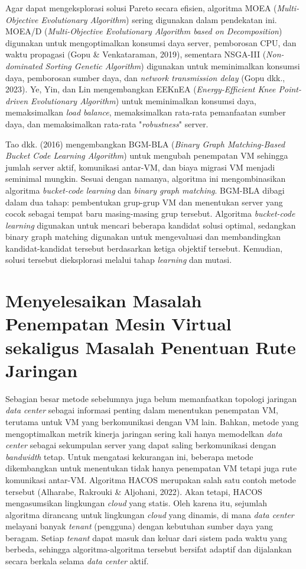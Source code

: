 Agar dapat mengeksplorasi solusi Pareto secara efisien, algoritma MOEA (\textit{Multi-Objective Evolutionary Algorithm}) sering digunakan dalam pendekatan ini. MOEA/D (\textit{Multi-Objective Evolutionary Algorithm based on Decomposition}) digunakan untuk mengoptimalkan konsumsi daya server, pemborosan CPU, dan waktu propagasi (Gopu \& Venkataraman, 2019), sementara NSGA-III (\textit{Non-dominated Sorting Genetic Algorithm}) digunakan untuk meminimalkan konsumsi daya, pemborosan sumber daya, dan \textit{network transmission delay} (Gopu dkk., 2023). Ye, Yin, dan Lin mengembangkan EEKnEA (\textit{Energy-Efficient Knee Point-driven Evolutionary Algorithm}) untuk meminimalkan konsumsi daya, memaksimalkan \textit{load balance}, memaksimalkan rata-rata pemanfaatan sumber daya, dan memaksimalkan rata-rata "\textit{robustness}" server. 

Tao dkk. (2016) mengembangkan BGM-BLA (\textit{Binary Graph Matching-Based Bucket Code Learning Algorithm}) untuk mengubah penempatan VM sehingga jumlah server aktif, komunikasi antar-VM, dan biaya migrasi VM menjadi seminimal mungkin. Sesuai dengan namanya, algoritma ini mengombinasikan algoritma \textit{bucket-code learning} dan \textit{binary graph matching}. BGM-BLA dibagi dalam dua tahap: pembentukan grup-grup VM dan menentukan server yang cocok sebagai tempat baru masing-masing grup tersebut. Algoritma \textit{bucket-code learning} digunakan untuk mencari beberapa kandidat solusi optimal, sedangkan binary graph matching digunakan untuk mengevaluasi dan membandingkan kandidat-kandidat tersebut berdasarkan ketiga objektif tersebut. Kemudian, solusi tersebut dieksplorasi melalui tahap \textit{learning} dan mutasi.


\section{Menyelesaikan Masalah Penempatan Mesin Virtual sekaligus Masalah Penentuan Rute Jaringan}
Sebagian besar metode sebelumnya juga belum memanfaatkan topologi jaringan \textit{data center} sebagai informasi penting dalam menentukan penempatan VM, terutama untuk VM yang berkomunikasi dengan VM lain. Bahkan, metode yang mengoptimalkan metrik kinerja jaringan sering kali hanya memodelkan \textit{data center} sebagai sekumpulan server yang dapat saling berkomunikasi dengan \textit{bandwidth} tetap. Untuk mengatasi kekurangan ini, beberapa metode dikembangkan untuk menentukan tidak hanya penempatan VM tetapi juga rute komunikasi antar-VM. Algoritma HACOS merupakan salah satu contoh metode tersebut (Alharabe, Rakrouki \& Aljohani, 2022). Akan tetapi, HACOS mengasumsikan lingkungan \textit{cloud} yang statis. Oleh karena itu, sejumlah algoritma dirancang untuk lingkungan \textit{cloud} yang dinamis, di mana \textit{data center} melayani banyak \textit{tenant} (pengguna) dengan kebutuhan sumber daya yang beragam. Setiap \textit{tenant} dapat masuk dan keluar dari sistem pada waktu yang berbeda, sehingga algoritma-algoritma tersebut bersifat adaptif dan dijalankan secara berkala selama \textit{data center} aktif.

